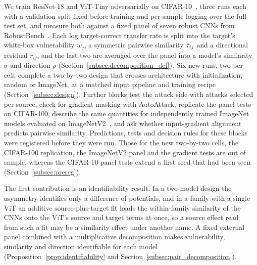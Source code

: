 We train ResNet-18 and ViT-Tiny adversarially on CIFAR-10~\cite{krizhevsky2009learning}, three runs each with a validation split fixed before training and per-sample logging over the full test set, and measure both against a fixed panel of seven robust CNNs from RobustBench~\cite{croce2021robustbench}. Each log target-correct transfer rate is split into the target's white-box vulnerability $w_j$, a symmetric pairwise similarity $\bar{\tau}_{ij}$ and a directional residual $r_{ij}$, and the last two are averaged over the panel into a model's similarity $\sigma$ and direction $\rho$ (Section~\ref{subsec:decomposition_def}). Six new runs, two per cell, complete a two-by-two design that crosses architecture with initialization, random or ImageNet, at a matched input pipeline and training recipe (Section~\ref{subsec:design}). Further blocks test the attack side with attacks selected per source, check for gradient masking with AutoAttack, replicate the panel tests on CIFAR-100, describe the same quantities for independently trained ImageNet models evaluated on ImageNetV2~\cite{recht2019imagenet}, and ask whether input-gradient alignment~\cite{zhang2024why} predicts pairwise similarity. Predictions, tests and decision rules for these blocks were registered before they were run. Those for the new two-by-two cells, the CIFAR-100 replication, the ImageNetV2 panel and the gradient tests are out of sample, whereas the CIFAR-10 panel tests extend a first seed that had been seen (Section~\ref{subsec:prereg}).

The first contribution is an identifiability result. In a two-model design the asymmetry identifies only a difference of potentials, and in a family with a single ViT an additive source-plus-target fit loads the within-family similarity of the CNNs onto the ViT's source and target terms at once, so a source effect read from such a fit may be a similarity effect under another name. A fixed external panel combined with a multiplicative decomposition makes vulnerability, similarity and direction identifiable for each model (Proposition~\ref{prop:identifiability} and Section~\ref{subsec:pair_decomposition}).

